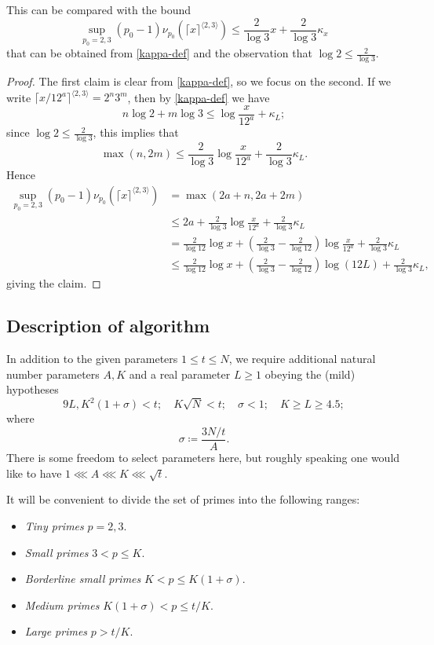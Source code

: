\documentclass[12pt,a4paper,reqno]{amsart}
\numberwithin{equation}{section}
\theoremstyle{plain}
\theoremstyle{definition}
\begin{document}
This can be compared with the bound
$$ \sup_{p_0=2,3} (p_0-1) \nu_{p_0}(\lceil x \rceil^{\langle 2,3\rangle}) \leq \frac{2}{\log 3} x + \frac{2}{\log 3} \kappa_x$$
that can be obtained from \eqref{kappa-def} and the observation that $\log 2 \leq \frac{2}{\log 3}$.  

\begin{proof} The first claim is clear from \eqref{kappa-def}, so we focus on the second.  If we write $\lceil x/12^a \rceil^{\langle 2,3 \rangle} = 2^n 3^m$, then by \eqref{kappa-def} we have
$$ n \log 2 + m \log 3 \leq \log \frac{x}{12^a} + \kappa_L;$$
since $\log 2 \leq \frac{2}{\log 3}$, this implies that
$$ \max( n, 2m ) \leq \frac{2}{\log 3} \log \frac{x}{12^a}
+ \frac{2}{\log 3} \kappa_L.$$
Hence 
\begin{align*}
  \sup_{p_0=2,3} (p_0-1) \nu_{p_0}(\lceil x \rceil^{\langle 2,3\rangle}) &= \max(2a+n, 2a+2m) \\
  &\leq 2a + \frac{2}{\log 3} \log \frac{x}{12^a}
  + \frac{2}{\log 3} \kappa_L \\
  &= \frac{2}{\log 12} \log x + 
  \left(\frac{2}{\log 3} - \frac{2}{\log 12}\right) \log \frac{x}{12^a}
  + \frac{2}{\log 3} \kappa_L \\
  & \leq \frac{2}{\log 12} \log x + 
  \left(\frac{2}{\log 3} - \frac{2}{\log 12}\right) \log(12L)
  + \frac{2}{\log 3} \kappa_L,
\end{align*}
giving the claim.
\end{proof}

\subsection{Description of algorithm}\label{alg-desc}

In addition to the given parameters $1 \leq t \leq N$, we require additional natural number parameters $A,K$ and a real parameter $L \geq 1$ obeying the (mild) hypotheses
\begin{equation}\label{condition}
  9L, K^2 (1+\sigma) < t; \quad K\sqrt{N} < t; \quad \sigma < 1; \quad K \geq L \geq 4.5; 
\end{equation}
where
\begin{equation}\label{sigma-def}
  \sigma \coloneqq \frac{3N/t}{A}.
\end{equation}  
There is some freedom to select parameters here, but roughly speaking one would like to have $1 \lll A \lll K \lll \sqrt{t}$.

It will be convenient to divide the set of primes into the following ranges:
\begin{itemize}
\item \emph{Tiny primes} $p=2,3$.
\item \emph{Small primes} $3 < p \leq K$.
\item \emph{Borderline small primes} $K < p \leq K(1+\sigma)$.
\item \emph{Medium primes} $K(1+\sigma) < p \leq t/K$.
\item \emph{Large primes} $p > t/K$.
\end{itemize}
\end{document}
